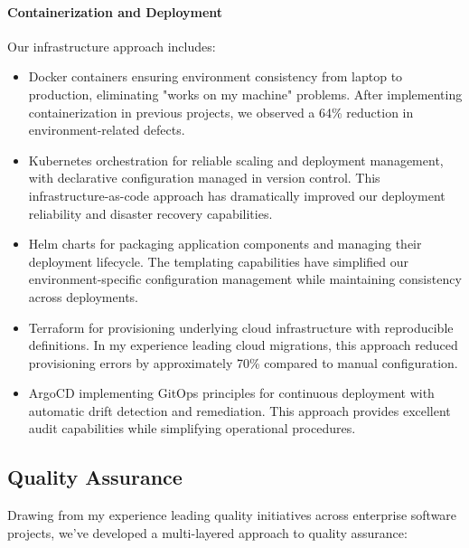 \documentclass[12pt,a4paper]{article}
\begin{document}
\paragraph{Containerization and Deployment}
Our infrastructure approach includes:
\begin{itemize}
    \item Docker containers ensuring environment consistency from laptop to production, eliminating "works on my machine" problems. After implementing containerization in previous projects, we observed a 64\% reduction in environment-related defects.
    \item Kubernetes orchestration for reliable scaling and deployment management, with declarative configuration managed in version control. This infrastructure-as-code approach has dramatically improved our deployment reliability and disaster recovery capabilities.
    \item Helm charts for packaging application components and managing their deployment lifecycle. The templating capabilities have simplified our environment-specific configuration management while maintaining consistency across deployments.
    \item Terraform for provisioning underlying cloud infrastructure with reproducible definitions. In my experience leading cloud migrations, this approach reduced provisioning errors by approximately 70\% compared to manual configuration.
    \item ArgoCD implementing GitOps principles for continuous deployment with automatic drift detection and remediation. This approach provides excellent audit capabilities while simplifying operational procedures.
\end{itemize}

\subsection{Quality Assurance}

Drawing from my experience leading quality initiatives across enterprise software projects, we've developed a multi-layered approach to quality assurance:
\end{document}
